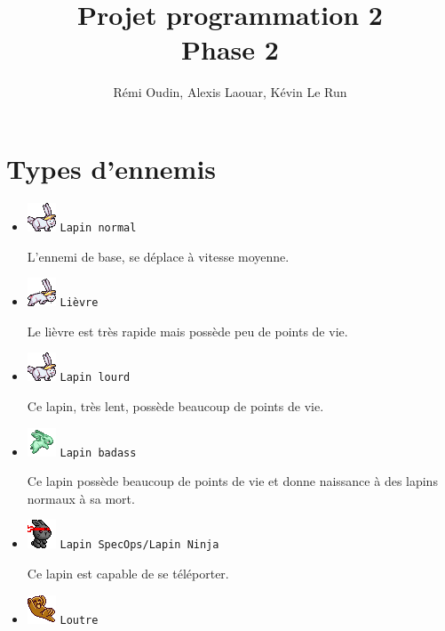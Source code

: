 \documentclass{article}
\title{Projet programmation 2\\Phase 2}
\author{R\'emi Oudin, Alexis Laouar, K\'evin Le Run}
\date{}
\begin{document}
\maketitle

\section{Types d'ennemis}

\begin{itemize}

\item \includegraphics{bunny_alt1.png} \texttt{Lapin normal}

L'ennemi de base, se d\'eplace \`a vitesse moyenne.

\item \includegraphics{hare_alt1.png} \texttt{Li\`evre}

Le li\`evre est tr\`es rapide mais poss\`ede peu de points de vie.

\item \includegraphics{bunny_alt1.png} \texttt{Lapin lourd}

Ce lapin, tr\`es lent, poss\`ede beaucoup de points de vie.

\item \includegraphics{badassbunny.png} \texttt{Lapin badass}

Ce lapin poss\`ede beaucoup de points de vie et donne naissance \`a des lapins
normaux \`a sa mort.

\item \includegraphics{ninja.png} \texttt{Lapin SpecOps/Lapin Ninja}

Ce lapin est capable de se t\'el\'eporter.

\item \includegraphics{otter.png} \texttt{Loutre}


\end{itemize}
\end{document}
